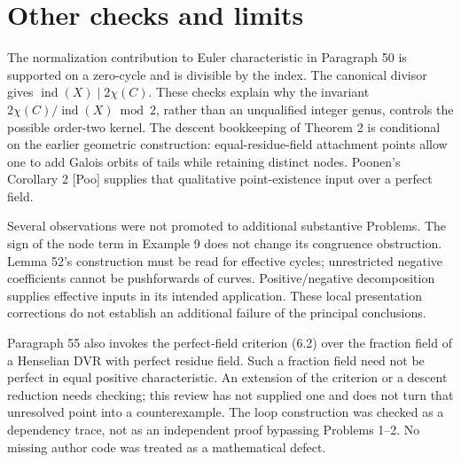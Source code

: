 \documentclass[10pt]{article}
\begin{document}
\section*{Other checks and limits}
The normalization contribution to Euler characteristic in Paragraph 50 is supported on a zero-cycle and is divisible by the index. The canonical divisor gives \(\operatorname{ind}(X)\mid2\chi(C)\). These checks explain why the invariant \(2\chi(C)/\operatorname{ind}(X)\bmod2\), rather than an unqualified integer genus, controls the possible order-two kernel. The descent bookkeeping of Theorem 2 is conditional on the earlier geometric construction: equal-residue-field attachment points allow one to add Galois orbits of tails while retaining distinct nodes. Poonen’s Corollary 2 [Poo] supplies that qualitative point-existence input over a perfect field.\par
Several observations were not promoted to additional substantive Problems. The sign of the node term in Example 9 does not change its congruence obstruction. Lemma 52’s construction must be read for effective cycles; unrestricted negative coefficients cannot be pushforwards of curves. Positive/negative decomposition supplies effective inputs in its intended application. These local presentation corrections do not establish an additional failure of the principal conclusions.\par
Paragraph 55 also invokes the perfect-field criterion (6.2) over the fraction field of a Henselian DVR with perfect residue field. Such a fraction field need not be perfect in equal positive characteristic. An extension of the criterion or a descent reduction needs checking; this review has not supplied one and does not turn that unresolved point into a counterexample. The loop construction was checked as a dependency trace, not as an independent proof bypassing Problems 1–2. No missing author code was treated as a mathematical defect.\par
\end{document}
